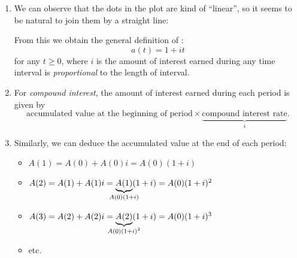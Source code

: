 \begin{enumerate}
\begin{remark}
\end{remark}
\item We can observe that the dots in the plot are kind of ``linear'', so it
seems to be natural to join them by a straight line:
\begin{center}
\end{center}
From this we obtain the general definition of :
\[
a(t)=1+it
\]
for any \(t\ge 0\), where \(i\) is the 
 amount of interest earned during any time interval is
\emph{proportional} to the length of interval.

\item For \emph{compound interest}, the amount of interest earned during each
period is given by
\[
\text{accumulated value at the beginning of period}\times\underbrace{\text{compound interest rate}}_{i}.
\]

\item Similarly, we can deduce the accumulated value at the end of each period:
\begin{itemize}
\item \(A(1)=A(0)+A(0)i=A(0)(1+i)\)
\item \(A(2)=A(1)+A(1)i=\underbrace{A(1)}_{\mathclap{A(0)(1+i)}}(1+i)=A(0)(1+i)^{2}\)
\item \(A(3)=A(2)+A(2)i=\underbrace{A(2)}_{\mathclap{A(0)(1+i)^{2}}}(1+i)=A(0)(1+i)^{3}\)
\item etc.
\end{itemize}


\end{enumerate}
